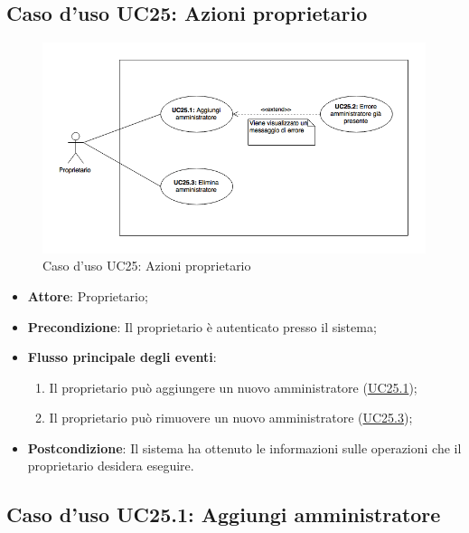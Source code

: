 \documentclass[12pt,a4paper]{article}
\begin{document}
\subsection{Caso d'uso UC25: Azioni proprietario}
\begin{figure}[H]
	\centering
	\includegraphics[width=\textwidth]{diagramUC25.png}
	\caption{Caso d'uso UC25: Azioni proprietario}\label{fig:UC25} 
\end{figure}
\begin{itemize}

\item \textbf{Attore}: Proprietario; 
\item \textbf{Precondizione}: Il proprietario è autenticato presso il sistema;

\item \textbf{Flusso principale degli eventi}:
\begin{enumerate}
	\item Il proprietario può aggiungere un nuovo amministratore (\hyperlink{UC25.1}{UC25.1});
	\item Il proprietario può rimuovere un nuovo amministratore (\hyperlink{UC25.3}{UC25.3});
	
\end{enumerate}
\item \textbf{Postcondizione}: Il sistema ha ottenuto le informazioni sulle operazioni che il proprietario desidera eseguire.
\end{itemize}
\hypertarget{UC25.1}{}
\subsection{Caso d'uso UC25.1: Aggiungi amministratore}
\end{document}
